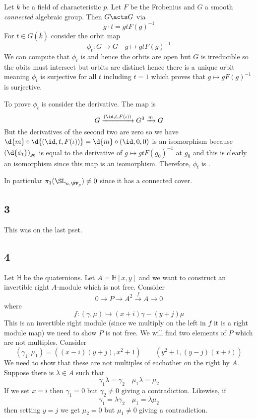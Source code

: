 \documentclass{article}
\begin{document}
Let $k$ be a field of characteristic $p$. Let $F$ be the Frobenius and $G$ a smooth \textit{connected} algebraic group. Then $G \acts G$ via 
\[g \cdot t =  g t F(g)^{-1} \]
For $t \in G(\bar{k})$ consider the orbit map
\[ \phi_t : G \to G \quad g \mapsto g t F(g)^{-1} \]
We can compute that $\phi_t$ is \etale and hence the orbits are open but $G$ is irreducible so the obits must intersect but orbits are distinct hence there is a unique orbit meaning $\phi_t$ is surjective for all $t$ including $t = 1$ which proves that $g \mapsto g F(g)^{-1}$ is surjective. 
\par 
To prove $\phi_t$ is \etale consider the derivative. The map is 
\[ G \xrightarrow{(\id, t, F(\iota))} G^3 \xrightarrow{m} G \]
But the derivatives of the second two are zero so we have $\d{m} \circ \d{(\id, t, F(\iota))} = \d{m} \circ (\id, 0, 0)$ is an isomorphism because $(\d{\phi_t})_{g_0}$ is equal to the derivative of $g \mapsto g t F(g_0)^{-1}$ at $g_0$ and this is clearly an isomorphism since this map is an isomorphism. Therefore, $\phi_t$ is \etale.  
\par 
In particular $\pi_1(\SL_{n, \bar{\FF}_p}) \neq 0$ since it has a connected \etale cover.


\subsection{3}

This was on the last pset. 

\subsection{4}

\newcommand{\HH}{\mathbb{H}}

Let $\HH$ be the quaternions. Let $A = \HH[x,y]$ and we want to construct an invertible right $A$-module which is not free. Consider
\[ 0 \to P \to A^2 \xrightarrow{f} A \to 0 \]
where
\[ f : (\gamma, \mu) \mapsto (x + i) \gamma - (y + j) \mu \]
This is an invertible right module (since we multiply on the left in $f$ it is a right module map) we need to show $P$ is not free. We will find two elements of $P$ which are not multiples. Consider
\[ (\gamma_1, \mu_1) = ((x-i)(y + j),x^2 + 1) \quad \quad (y^2 + 1, (y - j)(x+i)) \]
We need to show that these are not multiples of eachother on the right by $A$. Suppose there is $\lambda \in A$ such that
\[ \gamma_1 \lambda = \gamma_2 \quad \mu_1 \lambda = \mu_2 \]
If we set $x = i$ then $\gamma_1 = 0$ but $\gamma_2 \neq 0$ giving a contradiction. Likewise, if 
\[ \gamma_1 = \lambda \gamma_2 \quad \mu_1 = \lambda \mu_2 \]
then setting $y = j$ we get $\mu_2 = 0$ but $\mu_1 \neq 0$ giving a contradiction.
\end{document}
